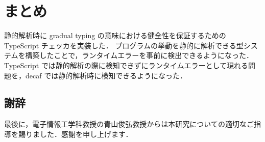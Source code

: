 \chapter{まとめ}

静的解析時に gradual typing の意味における健全性を保証するための TypeScript チェッカを実装した．
プログラムの挙動を静的に解析できる型システムを構築したことで，ランタイムエラーを事前に検出できるようになった．
TypeScript では静的解析の際に検知できずにランタイムエラーとして現れる問題を，decaf では静的解析時に検知できるようになった．

\section{謝辞}

最後に，電子情報工学科教授の青山俊弘教授からは本研究についての適切なご指導を賜りました．感謝を申し上げます．
